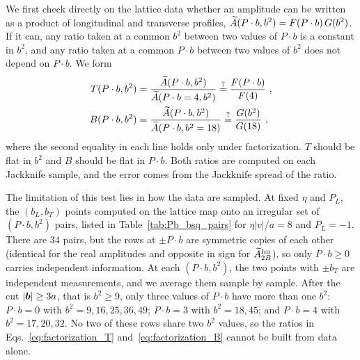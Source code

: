 We first check directly on the lattice data whether an amplitude can be written as a product of longitudinal and transverse profiles, $\widetilde{A}(P\cdot b,b^2) = F(P\cdot b)\,G(b^2)$. If it can, any ratio taken at a common $b^2$ between two values of $P\cdot b$ is a constant in $b^2$, and any ratio taken at a common $P\cdot b$ between two values of $b^2$ does not depend on $P\cdot b$. We form
\begin{align}
    T(P\cdot b, b^2) &= \frac{\widetilde{A}(P\cdot b, b^2)}{\widetilde{A}(P\cdot b = 4, b^2)} \overset{?}{=} \frac{F(P\cdot b)}{F(4)} \ , \label{eq:factorization_T}\\
    B(P\cdot b, b^2) &= \frac{\widetilde{A}(P\cdot b, b^2)}{\widetilde{A}(P\cdot b, b^2 = 18)} \overset{?}{=} \frac{G(b^2)}{G(18)} \ , \label{eq:factorization_B}
\end{align}
where the second equality in each line holds only under factorization. $T$ should be flat in $b^2$ and $B$ should be flat in $P\cdot b$. Both ratios are computed on each Jackknife sample, and the error comes from the Jackknife spread of the ratio.

The limitation of this test lies in how the data are sampled. At fixed $\eta$ and $P_L$, the $(b_L, b_T)$ points computed on the lattice map onto an irregular set of $(P\cdot b, b^2)$ pairs, listed in Table~\ref{tab:Pb_bsq_pairs} for $\eta|v|/a = 8$ and $P_L = -1$. There are 34 pairs, but the rows at $\pm P\cdot b$ are symmetric copies of each other (identical for the real amplitudes and opposite in sign for $\widetilde{A}_{2B}^{\text{Im}}$), so only $P\cdot b \ge 0$ carries independent information. At each $(P\cdot b, b^2)$, the two points with $\pm b_T$ are independent measurements, and we average them sample by sample. After the cut $|\boldsymbol{b}| \ge 3a$, that is $b^2 \ge 9$, only three values of $P\cdot b$ have more than one $b^2$: $P\cdot b = 0$ with $b^2 = 9, 16, 25, 36, 49$; $P\cdot b = 3$ with $b^2 = 18, 45$; and $P\cdot b = 4$ with $b^2 = 17, 20, 32$. No two of these rows share two $b^2$ values, so the ratios in Eqs.~\eqref{eq:factorization_T} and~\eqref{eq:factorization_B} cannot be built from data alone.

